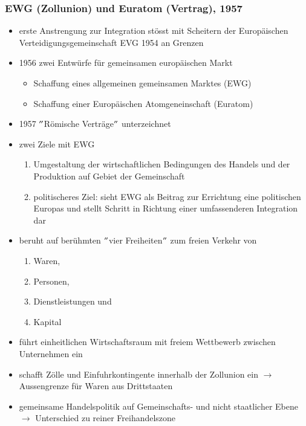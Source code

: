 \subsubsection{EWG (Zollunion) und Euratom (Vertrag), 1957}
\begin{itemize}
	\item erste Anstrengung zur Integration stösst mit Scheitern der Europäischen Verteidigungsgemeinschaft EVG 1954 an Grenzen
	\item 1956 zwei Entwürfe für gemeinsamen europäischen Markt
	\begin{itemize}
		\item Schaffung eines allgemeinen gemeinsamen Marktes (EWG)
		\item Schaffung einer Europäischen Atomgeneinschaft (Euratom)
	\end{itemize}
	\item 1957 $"$Römische Verträge$"$ unterzeichnet
	\item zwei Ziele mit EWG
	\begin{enumerate}
		\item Umgestaltung der wirtschaftlichen Bedingungen des Handels und der Produktion auf Gebiet der Gemeinschaft
		\item politischeres Ziel: sieht EWG als Beitrag zur Errichtung eine politischen Europas und stellt Schritt in Richtung einer umfassenderen Integration dar
	\end{enumerate}
	\item beruht auf berühmten $"$vier Freiheiten$"$ zum freien Verkehr von
	\begin{enumerate}
		\item Waren, 
		\item Personen,
		\item Dienstleistungen und
		\item Kapital
	\end{enumerate}
	\item führt einheitlichen Wirtschaftsraum mit freiem Wettbewerb zwischen Unternehmen ein
	\item schafft Zölle und Einfuhrkontingente innerhalb der Zollunion ein $\rightarrow$ Aussengrenze für Waren aus Drittstaaten
	\item gemeinsame Handelspolitik auf Gemeinschafts- und nicht staatlicher Ebene $\rightarrow$ Unterschied zu reiner Freihandelszone
\end{itemize}

